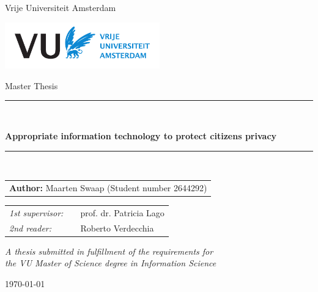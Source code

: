 \documentclass[twoside,11pt]{Latex/Classes/PhDthesisPSnPDF}
\begin{document}
\thispagestyle{empty}

\begin{center}

Vrije Universiteit Amsterdam 

\vspace{1mm}

\includegraphics[height=20mm]{0_frontmatter/figures/vu-griffioen.pdf}

\vspace{2cm}

{\Large Master Thesis}

\vspace*{1.5cm}

\rule{.9\linewidth}{.6pt}\\[0.4cm]
{\huge \bfseries Appropriate information technology to protect citizens privacy\par}\vspace{0.4cm}
\rule{.9\linewidth}{.6pt}\\[1.5cm]

\vspace*{2mm}

{\Large
\begin{tabular}{l}
{\bf Author:} Maarten Swaap (Student number 2644292)
\end{tabular}
}

\vspace*{2cm}

\begin{tabular}{ll}
{\it 1st supervisor:}   & ~~prof. dr. Patricia Lago \\
{\it 2nd reader:}       & ~~Roberto Verdecchia %
\end{tabular}

\vspace*{2.5cm}

\textit{A thesis submitted in fulfillment of the requirements for\\ the VU Master of Science degree in Information Science}

\vspace*{1.8cm}

\today\\[4cm] %

\end{center}
\end{document}
